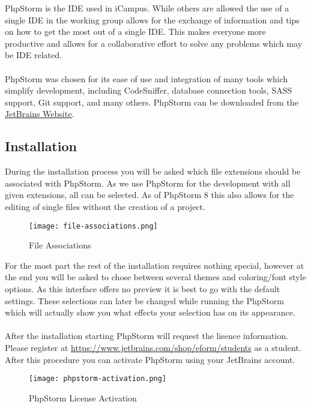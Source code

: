 PhpStorm is the IDE used in iCampus. While others are allowed the use of a single IDE in the working group allows for the exchange of information and tips on how to get the most out of a single IDE. This makes everyone more productive and allows for a collaborative effort to solve any problems which may be IDE related.\\
\\
PhpStorm was chosen for its ease of use and integration of many tools which simplify development, including CodeSniffer, database connection tools, SASS support, Git support, and many others. PhpStorm can be downloaded from the \href{http://www.jetbrains.com/phpstorm/}{JetBrains Website}.

\subsection{Installation}
During the installation process you will be asked which file extensions should be associated with PhpStorm. As we use PhpStorm for the development with all given extensions, all can be selected. As of PhpStorm 8 this also allows for the editing of single files without the creation of a project.

\begin{figure}[h] 
	\centering
	\vspace{3pt}
	\texttt{[image: file-associations.png]}
	\caption{File Associations}
\end{figure}

\noindent
For the most part the rest of the installation requires nothing special, however at the end you will be asked to chose between several themes and coloring/font style options. As this interface offers no preview it is best to go with the default settings. These selections can later be changed while running the PhpStorm which will actually show you what effects your selection has on its appearance.\\
\\
After the installation starting PhpStorm will request the lisence information. Please register at \url{https://www.jetbrains.com/shop/eform/students} as a student. After this procedure you can activate PhpStorm using your JetBrains account.

\begin{figure}[h]
	\centering
	\vspace{3pt}
	\texttt{[image: phpstorm-activation.png]}
	\caption{PhpStorm License Activation}
\end{figure}

